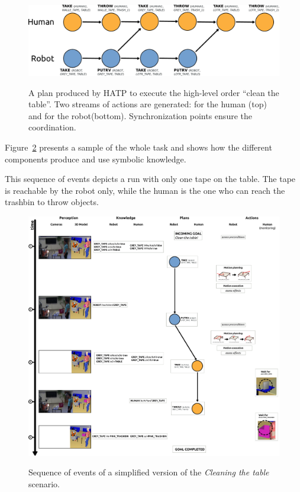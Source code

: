 \documentclass[preprint,3p,times]{elsarticle}
\begin{document}
\begin{figure}[thpb]
  \centering
  \includegraphics[width=1.0\textwidth]{third_plan.pdf} \\
  \caption {A plan produced by HATP to execute the high-level order ``clean the table''. Two streams of actions are generated: for the human (top) and for the robot(bottom). Synchronization points ensure the coordination.}
  \label{plan-etat2}
\end{figure}

Figure~\ref{fig|cleantable-timeline} presents a sample of the whole task and
shows how the different components produce and use symbolic knowledge.

This sequence of events depicts a run with only one tape on the table. The tape is
reachable by the robot only, while the human is the one who can reach the
trashbin to throw objects.

\begin{figure}[thpb]
  \centering
    \includegraphics[width=1.0\textwidth]{manip_run.pdf} \\
        \caption {Sequence of events of a simplified version of the \emph{Cleaning the table} scenario.}
  \label{fig|cleantable-timeline}
\end{figure}
\end{document}
